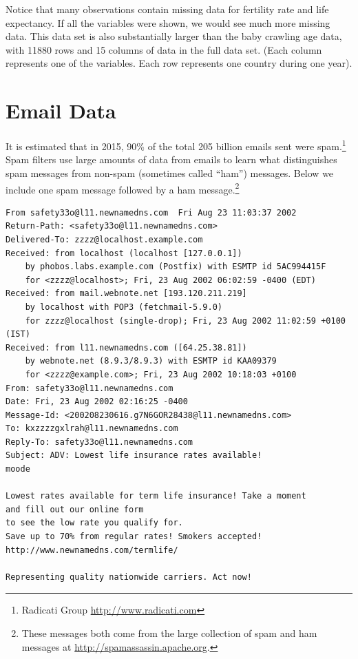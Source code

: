 \documentclass[]{krantz}
\begin{document}
Notice that many observations contain missing data for fertility rate
and life expectancy. If all the variables were shown, we would see much
more missing data. This data set is also substantially larger than the
baby crawling age data, with 11880 rows and 15 columns of data in the
full data set. (Each column represents one of the variables. Each row
represents one country during one year).

\section{Email Data}\label{email-data}

It is estimated that in 2015, 90\% of the total 205 billion emails sent
were spam.\footnote{Radicati Group \url{http://www.radicati.com}} Spam
filters use large amounts of data from emails to learn what
distinguishes spam messages from non-spam (sometimes called ``ham'')
messages. Below we include one spam message followed by a ham
message.\footnote{These messages both come from the large collection of
  spam and ham messages at \url{http://spamassassin.apache.org}.}

\begin{verbatim}
From safety33o@l11.newnamedns.com  Fri Aug 23 11:03:37 2002
Return-Path: <safety33o@l11.newnamedns.com>
Delivered-To: zzzz@localhost.example.com
Received: from localhost (localhost [127.0.0.1])
    by phobos.labs.example.com (Postfix) with ESMTP id 5AC994415F
    for <zzzz@localhost>; Fri, 23 Aug 2002 06:02:59 -0400 (EDT)
Received: from mail.webnote.net [193.120.211.219]
    by localhost with POP3 (fetchmail-5.9.0)
    for zzzz@localhost (single-drop); Fri, 23 Aug 2002 11:02:59 +0100 (IST)
Received: from l11.newnamedns.com ([64.25.38.81])
    by webnote.net (8.9.3/8.9.3) with ESMTP id KAA09379
    for <zzzz@example.com>; Fri, 23 Aug 2002 10:18:03 +0100
From: safety33o@l11.newnamedns.com
Date: Fri, 23 Aug 2002 02:16:25 -0400
Message-Id: <200208230616.g7N6GOR28438@l11.newnamedns.com>
To: kxzzzzgxlrah@l11.newnamedns.com
Reply-To: safety33o@l11.newnamedns.com
Subject: ADV: Lowest life insurance rates available!                                                   
moode

Lowest rates available for term life insurance! Take a moment 
and fill out our online form 
to see the low rate you qualify for. 
Save up to 70% from regular rates! Smokers accepted! 
http://www.newnamedns.com/termlife/ 
          
Representing quality nationwide carriers. Act now!
\end{verbatim}
\end{document}
